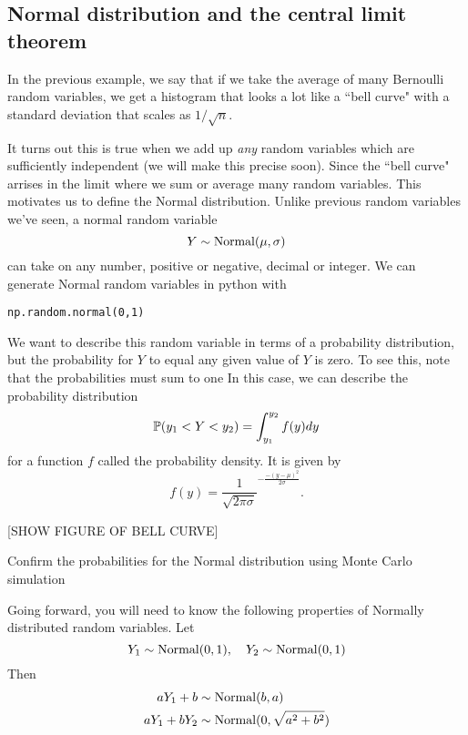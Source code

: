 \subsection{Normal distribution and the central limit theorem}

In the previous example, we say that if we take the average of many Bernoulli random variables, we get a histogram that looks a lot like a ``bell curve" with a standard deviation that scales as $1/\sqrt{n}$.

It turns out this is true when we add up \emph{any} random variables which are sufficiently independent (we will make this precise soon). Since the ``bell curve" arrises in the limit where we sum or average many random variables. This motivates us to define the Normal distribution. Unlike previous random variables we've seen, a normal random variable 
\begin{equation}
Y \sim {\rm Normal}(\mu,\sigma)
\end{equation}
can take on any number, positive or negative, decimal or integer. 
We can generate Normal random variables in python with 
\begin{Verbatim}
np.random.normal(0,1)
\end{Verbatim}


We want to describe this random variable in terms of a probability distribution, but the probability for $Y$ to equal any given value of $Y$ is zero. To see this, note that the probabilities must sum to one  In this case, we can describe the probability distribution 
\begin{equation}
\mathbb P(y_1<Y<y_2) = \int_{y_1}^{y_2}f(y)dy 
\end{equation}
for a function $f$ called the probability density. It is given by 
\begin{equation}
f(y) = \frac{1}{\sqrt{2\pi \sigma}}^{-\frac{-(y-\mu)^2}{2\sigma}}. 
\end{equation} 


[SHOW FIGURE OF BELL CURVE]



\begin{example}
Confirm the probabilities for the Normal distribution using Monte Carlo simulation 
\end{example}


Going forward, you will need to know the following properties of Normally distributed random variables. Let 
\begin{equation}
Y_1 \sim {\rm Normal}(0,1),\quad Y_2 \sim {\rm Normal}(0,1)
\end{equation}
 Then 
\begin{align}
aY_1 + b &\sim {\rm Normal}(b,a)\\
aY_1 + bY_2 &\sim {\rm Normal}(0,\sqrt{a^2 + b^2})
\end{align}

